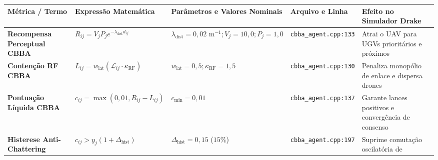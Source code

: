 \documentclass[
  brazilian,
  a4paper]{article}
\newcounter{none} %
\begin{document}
{\def\LTcaptype{none} %
\begin{longtable}[]{@{}
  >{\raggedright\arraybackslash}p{}
  >{\raggedright\arraybackslash}p{}
  >{\raggedright\arraybackslash}p{}
  >{\raggedright\arraybackslash}p{}
  >{\raggedright\arraybackslash}p{}@{}}
\toprule\noalign{}
\begin{minipage}[b]{\linewidth}\raggedright
Métrica / Termo
\end{minipage} & \begin{minipage}[b]{\linewidth}\raggedright
Expressão Matemática
\end{minipage} & \begin{minipage}[b]{\linewidth}\raggedright
Parâmetros e Valores Nominais
\end{minipage} & \begin{minipage}[b]{\linewidth}\raggedright
Arquivo e Linha
\end{minipage} & \begin{minipage}[b]{\linewidth}\raggedright
Efeito no Simulador Drake
\end{minipage} \\
\midrule\noalign{}
\endhead
\bottomrule\noalign{}
\endlastfoot
\textbf{Recompensa Perceptual CBBA} &
\(R_{ij} = V_j P_j e^{-\lambda_{\text{dist}} d_{ij}}\) &
\(\lambda_{\text{dist}} = 0{,}02\text{ m}^{-1}; V_j = 10{,}0; P_j = 1{,}0\)
& \texttt{cbba\_\allowbreak{}agent.\allowbreak{}cpp:\allowbreak{}133} & Atrai o UAV para UGVs prioritários e
próximos \\
\textbf{Contenção RF CBBA} &
\(L_{ij} = w_{\text{lat}} (\mathcal{L}_{ij} \cdot \kappa_{\text{RF}})\)
& \(w_{\text{lat}} = 0{,}5; \kappa_{\text{RF}} = 1{,}5\) &
\texttt{cbba\_\allowbreak{}agent.\allowbreak{}cpp:\allowbreak{}130} & Penaliza monopólio de enlace e dispersa
drones \\
\textbf{Pontuação Líquida CBBA} &
\(c_{ij} = \max(0{,}01, R_{ij} - L_{ij})\) & \(c_{\text{min}} = 0{,}01\)
& \texttt{cbba\_\allowbreak{}agent.\allowbreak{}cpp:\allowbreak{}137} & Garante lances positivos e convergência
de consenso \\
\textbf{Histerese Anti-Chattering} &
\(c_{ij} > y_j (1 + \Delta_{\text{hist}})\) &
\(\Delta_{\text{hist}} = 0{,}15\) (\(15\%\)) &
\texttt{cbba\_\allowbreak{}agent.\allowbreak{}cpp:\allowbreak{}197} & Suprime comutação oscilatória de

\end{longtable}}
\end{document}
